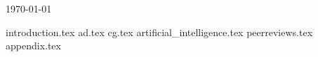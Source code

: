 \documentclass[12pt]{report}
\begin{document}
\begin{titlepage}

{\large \today}\\ %



\vfill %

\end{titlepage}

\tableofcontents

{introduction.tex}
{ad.tex}
{cg.tex}
{artificial_intelligence.tex}
{peerreviews.tex}
{appendix.tex}
\end{document}
